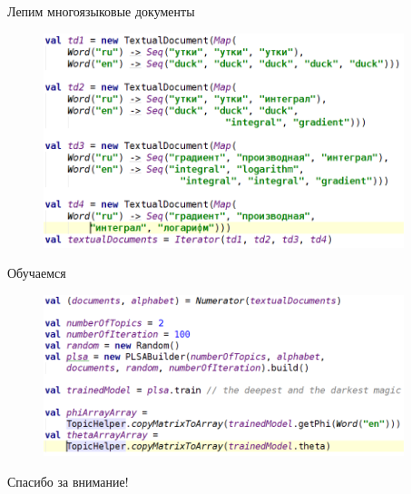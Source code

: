 \documentclass{beamer}
\begin{document}
\begin{frame}{Лепим многоязыковые документы}
    \begin{figure}[ht!]
	\centering
	\includegraphics[width=105mm]{multilingualQS}
	\label{overflow}
    \end{figure}
\end{frame}


\begin{frame}{Обучаемся}
    \begin{figure}[ht!]
	\centering
	\includegraphics[width=105mm]{multilingualQS1}
	\label{overflow}
    \end{figure}
\end{frame}


\begin{frame}
    \begin{center}
	\Huge Спасибо за внимание!
    \end{center}
\end{frame}
\end{document}
